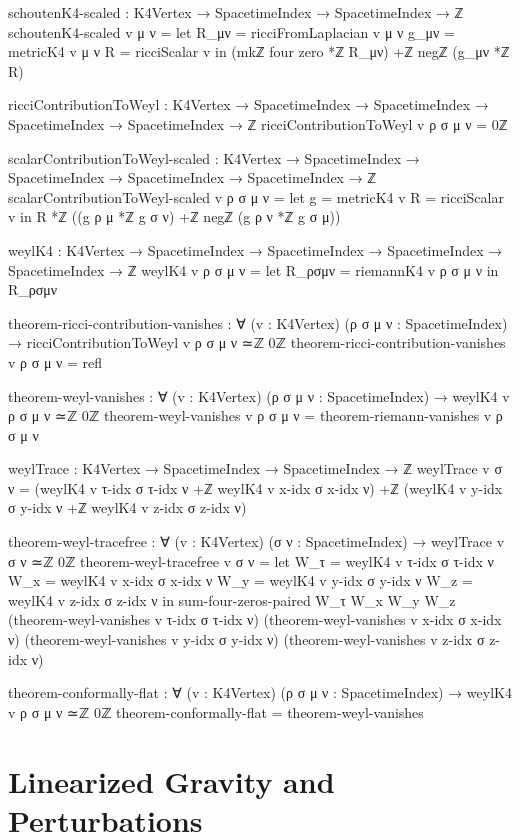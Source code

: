 \documentclass[11pt,a4paper]{book}
\begin{document}
\begin{code}
schoutenK4-scaled : K4Vertex → SpacetimeIndex → SpacetimeIndex → ℤ
schoutenK4-scaled v μ ν = 
  let R_μν = ricciFromLaplacian v μ ν
      g_μν = metricK4 v μ ν
      R    = ricciScalar v
  in (mkℤ four zero *ℤ R_μν) +ℤ negℤ (g_μν *ℤ R)

ricciContributionToWeyl : K4Vertex → SpacetimeIndex → SpacetimeIndex → 
                          SpacetimeIndex → SpacetimeIndex → ℤ
ricciContributionToWeyl v ρ σ μ ν = 0ℤ

scalarContributionToWeyl-scaled : K4Vertex → SpacetimeIndex → SpacetimeIndex → 
                                   SpacetimeIndex → SpacetimeIndex → ℤ
scalarContributionToWeyl-scaled v ρ σ μ ν =
  let g = metricK4 v
      R = ricciScalar v
  in R *ℤ ((g ρ μ *ℤ g σ ν) +ℤ negℤ (g ρ ν *ℤ g σ μ))

weylK4 : K4Vertex → SpacetimeIndex → SpacetimeIndex → 
         SpacetimeIndex → SpacetimeIndex → ℤ
weylK4 v ρ σ μ ν = 
  let R_ρσμν = riemannK4 v ρ σ μ ν
  in R_ρσμν

theorem-ricci-contribution-vanishes : ∀ (v : K4Vertex) (ρ σ μ ν : SpacetimeIndex) →
  ricciContributionToWeyl v ρ σ μ ν ≃ℤ 0ℤ
theorem-ricci-contribution-vanishes v ρ σ μ ν = refl

theorem-weyl-vanishes : ∀ (v : K4Vertex) (ρ σ μ ν : SpacetimeIndex) →
                         weylK4 v ρ σ μ ν ≃ℤ 0ℤ
theorem-weyl-vanishes v ρ σ μ ν = theorem-riemann-vanishes v ρ σ μ ν

weylTrace : K4Vertex → SpacetimeIndex → SpacetimeIndex → ℤ
weylTrace v σ ν = 
  (weylK4 v τ-idx σ τ-idx ν +ℤ weylK4 v x-idx σ x-idx ν) +ℤ
  (weylK4 v y-idx σ y-idx ν +ℤ weylK4 v z-idx σ z-idx ν)

theorem-weyl-tracefree : ∀ (v : K4Vertex) (σ ν : SpacetimeIndex) →
                          weylTrace v σ ν ≃ℤ 0ℤ
theorem-weyl-tracefree v σ ν = 
  let W_τ = weylK4 v τ-idx σ τ-idx ν
      W_x = weylK4 v x-idx σ x-idx ν
      W_y = weylK4 v y-idx σ y-idx ν
      W_z = weylK4 v z-idx σ z-idx ν
  in sum-four-zeros-paired W_τ W_x W_y W_z
       (theorem-weyl-vanishes v τ-idx σ τ-idx ν)
       (theorem-weyl-vanishes v x-idx σ x-idx ν)
       (theorem-weyl-vanishes v y-idx σ y-idx ν)
       (theorem-weyl-vanishes v z-idx σ z-idx ν)

theorem-conformally-flat : ∀ (v : K4Vertex) (ρ σ μ ν : SpacetimeIndex) →
  weylK4 v ρ σ μ ν ≃ℤ 0ℤ
theorem-conformally-flat = theorem-weyl-vanishes
\end{code}

\section{Linearized Gravity and Perturbations}
\end{document}
